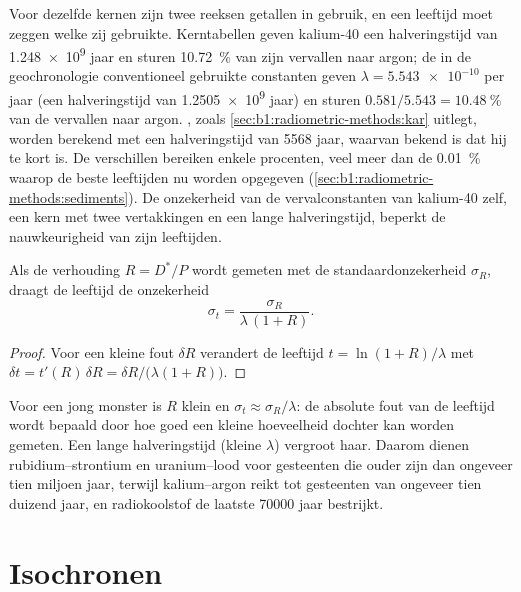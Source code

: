 Voor dezelfde kernen zijn twee reeksen getallen in gebruik, en een leeftijd moet zeggen welke zij gebruikte. Kerntabellen geven kalium-40 een halveringstijd van \num{1.248e9} jaar en sturen \qty{10.72}{\percent} van zijn vervallen naar argon; de in de geochronologie conventioneel gebruikte constanten geven $\lambda = \num{5.543e-10}$ per jaar (een halveringstijd van \num{1.2505e9}
jaar) en sturen $0.581/5.543 = \qty{10.48}{\percent}$ van de vervallen naar argon. , zoals \cref{sec:b1:radiometric-methods:kar} uitlegt, worden berekend met een halveringstijd van \num{5568} jaar, waarvan bekend is dat hij te kort is. De verschillen bereiken enkele procenten, veel meer dan de \qty{0.01}{\percent} waarop de beste leeftijden nu worden opgegeven (\cref{sec:b1:radiometric-methods:sediments}). De onzekerheid van de vervalconstanten van kalium-40 zelf, een kern met twee vertakkingen en een lange halveringstijd, beperkt de nauwkeurigheid van zijn leeftijden.

\begin{proposition}\label{prop:b1:radiometric-methods:precision}
Als de verhouding $R = D^*/P$ wordt gemeten met de standaardonzekerheid $\sigma_R$, draagt de leeftijd de onzekerheid
\[
  \sigma_t = \frac{\sigma_R}{\lambda\,(1 + R)}.
\]
\end{proposition}

\begin{proof}
Voor een kleine fout $\delta R$ verandert de leeftijd $t = \ln(1+R)/\lambda$ met
$\delta t = t'(R)\,\delta R = \delta R/\bigl(\lambda(1 + R)\bigr)$.
\end{proof}

Voor een jong monster is $R$ klein en $\sigma_t \approx \sigma_R/\lambda$: de absolute fout van de leeftijd wordt bepaald door hoe goed een kleine hoeveelheid dochter kan worden gemeten. Een lange halveringstijd (kleine $\lambda$) vergroot haar. Daarom dienen rubidium--strontium en uranium--lood voor gesteenten die ouder zijn dan ongeveer tien miljoen jaar, terwijl kalium--argon reikt tot gesteenten van ongeveer tien duizend jaar, en radiokoolstof de laatste \num{70000} jaar bestrijkt.

\section{Isochronen}\label{sec:b1:radiometric-methods:isochrons}

